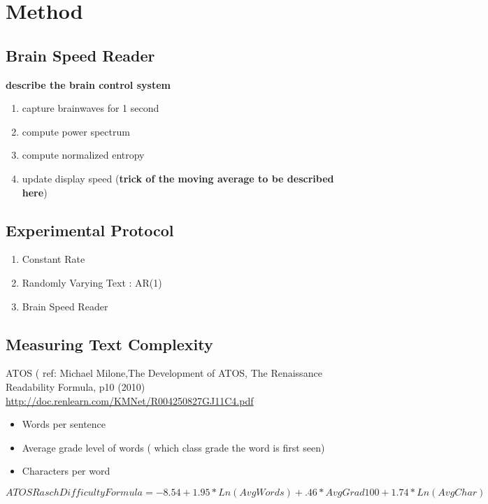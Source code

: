 \section{Method}

\subsection{Brain Speed Reader}

{\bf describe the brain control system}

\begin{enumerate}
  \item capture brainwaves for 1 second
  \item compute power spectrum
  \item compute normalized entropy
  \item update display speed ({\bf trick of the moving average to be described here})
\end{enumerate}


\subsection{Experimental Protocol}


\begin{enumerate}
  \item Constant Rate
  \item Randomly Varying Text : AR(1) 
  \item Brain Speed Reader
\end{enumerate}

\subsection{Measuring Text Complexity}

ATOS  ( ref: Michael Milone,The Development of ATOS, The Renaissance Readability Formula, p10 (2010) \url{http://doc.renlearn.com/KMNet/R004250827GJ11C4.pdf}

\begin{itemize}
  \item Words per sentence
  \item Average grade level of words ( which class grade the word is first seen)
  \item Characters per word
\end{itemize}


$ATOS Rasch Difficulty Formula = -8.54 + 1.95 * Ln(AvgWords) + .46 * AvgGrad100 + 1.74 * Ln(AvgChar)$

